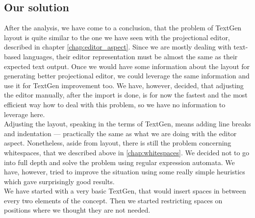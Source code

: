 \subsection{Our solution}
\label{chap:textgen_solution}

After the analysis, we have come to a conclusion, that the problem of TextGen layout is quite similar to the one we have seen with the projectional editor, described in chapter \ref{chap:editor_aspect}.
Since we are mostly dealing with text-based languages, their editor representation must be almost the same as their expected text output.
Once we would have some information about the layout for generating better projectional editor, we could leverage the same information and use it for TextGen improvement too.
We have, however, decided, that adjusting the editor manually, after the import is done, is for now the fastest and the most efficient way how to deal with this problem, so we have no information to leverage here.
\\

Adjusting the layout, speaking in the terms of TextGen, means adding line breaks and indentation --- practically the same as what we are doing with the editor aspect.
Nonetheless, aside from layout, there is still the problem concerning whitespaces, that we described above in \ref{chap:whitespaces}.
We decided not to go into full depth and solve the problem using regular expression automata.
We have, however, tried to improve the situation using some really simple heuristics which gave surprisingly good results.
\\

We have started with a very basic TextGen, that would insert spaces in between every two elements of the concept.
Then we started restricting spaces on positions where we thought they are not needed.

